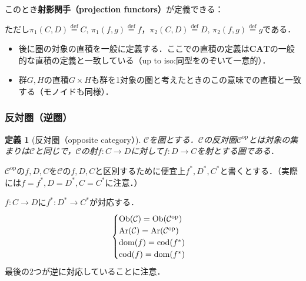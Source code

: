 \documentclass[dvipdfmx,a4j,10pt]{jsarticle}
\theoremstyle{mystyle1}
\theoremstyle{mystyle2}
\newtheorem{dfn*}{定義}
\theoremstyle{mystyle3}
\newcommand*{\defeq}{\stackrel{\text{def}}{=}}
\newcommand{\Ob}{{\rm Ob}}
\newcommand{\Ar}{{\rm Ar}}
\newcommand{\dom}{{\rm dom}}
\newcommand{\cod}{{\rm cod}}
\begin{document}
    このとき\textbf{射影関手（projection functors）}が定義できる：

    \begin{center}
    \end{center}
    ただし$\pi_1(C,D)\defeq C,\, \pi_1(f,g)\defeq f$，$\pi_2(C,D)\defeq D,\, \pi_2(f,g)\defeq g$である．

    \begin{itemize}
        \item 後に圏の対象の直積を一般に定義する．ここでの直積の定義は$\mathbf{CAT}$の一般的な直積の定義と一致している（up to iso:同型をのぞいて一意的）．
        \item 群$G,H$の直積$G\times H$も群を1対象の圏と考えたときのこの意味での直積と一致する（モノイドも同様）．
    \end{itemize}

    \subsubsection{反対圏（逆圏）}

    \begin{dfn*}[反対圏（opposite category）\footnotemark]
        $\mathcal{C}$を圏とする．$\mathcal{C}$の反対圏$\mathcal{C}^{\mathrm{op}}$とは対象の集まりは$\mathcal{C}$と同じで，$\mathcal{C}$の射$f:C\to D$に対して$f:D\to C$を射とする圏である．
    \end{dfn*}

$\mathcal{C}^{\mathrm{op}}$の$f,D,C$を$\mathcal{C}$の$f,D,C$と区別するために便宜上$f^*,D^*,C^*$と書くとする．（実際には$f=f^*,D=D^*,C=C^*$に注意．）

$f:C\to D$に$f^*:D^* \to C^*$が対応する．
    \[
        \begin{cases}
            \Ob(\mathcal{C})  =\Ob(\mathcal{C}^{\mathrm{op}}) \\
            \Ar(\mathcal{C})  =\Ar(\mathcal{C}^{\mathrm{op}}) \\
            \dom(f)           =\cod(f^*)                      \\
            \cod(f)           =\dom(f^*)
        \end{cases}
    \]
    最後の2つが逆に対応していることに注意．
\end{document}

